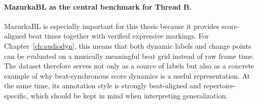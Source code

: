 
\paragraph{MazurkaBL as the central benchmark for Thread B.}
MazurkaBL is especially important for this thesis because it provides score-aligned beat times together with verified expressive markings. For Chapter~\ref{ch:audiodyn}, this means that both dynamic labels and change points can be evaluated on a musically meaningful beat grid instead of raw frame time. The dataset therefore serves not only as a source of labels but also as a concrete example of why beat-synchronous score dynamics is a useful representation. At the same time, its annotation style is strongly beat-aligned and repertoire-specific, which should be kept in mind when interpreting generalization.
